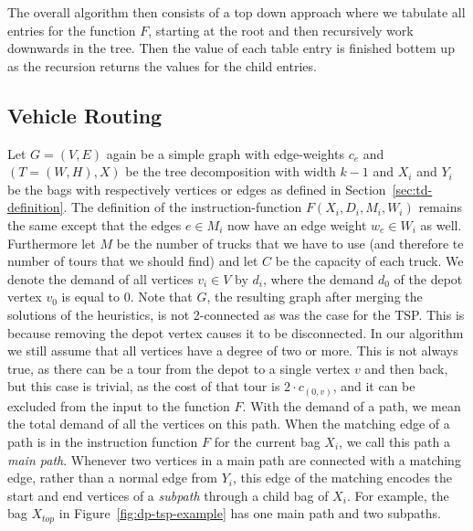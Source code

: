 \documentclass[titlepage, 12pt]{article}
\begin{document}
    The overall algorithm then consists of a top down approach where we tabulate all entries for
    the function $F$, starting at the root and then recursively work downwards in the tree. Then the
    value of each table entry is finished bottem up as the recursion returns the values for the
    child entries.



    \subsection{Vehicle Routing}
    \label{sec:dp-vrp}
    Let $G=(V, E)$ again be a simple graph with edge-weights $c_e$ and $(T=(W, H), X)$ be the tree
    decomposition with width $k - 1$ and $X_i$ and $Y_i$ be the bags with respectively vertices or
    edges as defined in Section~\ref{sec:td-definition}.
    The definition of the instruction-function $F(X_i, D_i, M_i, W_i)$ remains the same except that
    the edges $e \in M_i$ now have an edge weight $w_e \in W_i$ as well.
    Furthermore let $M$ be the number of trucks that we have to use (and therefore te number of
    tours that we should find) and let $C$ be the capacity of each truck. We denote the demand of
    all vertices $v_i \in V$ by $d_i$, where the demand $d_0$ of the depot vertex $v_0$ is equal to 0.
    Note that $G$, the resulting graph after merging the solutions of the heuristics, is not
    2-connected as was the case for the TSP\@. This is because removing the depot vertex causes it
    to be disconnected. In our algorithm we still assume that all vertices have a degree of two or
    more. This is not always true, as there can be a tour from the depot to a single vertex $v$ and
    then back, but this case is trivial, as the cost of that tour is $2 \cdot c_{(0, v)}$, and it
    can be excluded from the input to the function $F$.
    With the demand of a path, we mean the total demand of all the vertices on this path.
    When the matching edge of a path is in the instruction function $F$ for the current bag $X_i$,
    we call this path a \emph{main path}.
    Whenever two vertices in a main path are connected with a matching edge, rather than a normal
    edge from $Y_i$, this edge of the matching encodes the start and end vertices of a
    \emph{subpath} through a child bag of $X_i$.
    For example, the bag $X_{top}$ in Figure~\ref{fig:dp-tsp-example} has one main path and two
    subpaths.
\end{document}
